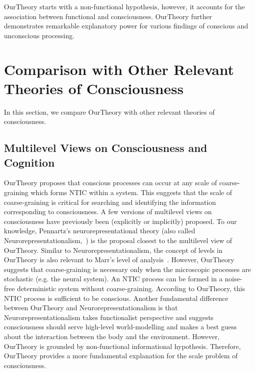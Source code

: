\documentclass[utf8]{article}
\begin{document}
    	    \ac{OurTheory} starts with a non-functional hypothesis, however, it accounts for the association between  functional and consciousness. \ac{OurTheory} further demonstrates remarkable explanatory power for various findings of conscious and unconscious processing. 
	    
    \section{Comparison with Other Relevant Theories of Consciousness}\label{sec:Comparison with other theories}
    In this section, we compare \ac{OurTheory} with other relevant theories of consciousness.
	
	
        \subsection{Multilevel Views on Consciousness and Cognition}\label{sec:MultiLevelView}
    		\ac{OurTheory} proposes that conscious processes can occur at any scale of coarse-graining which forms NTIC within a system. This suggests that the scale of coarse-graining is critical for searching and identifying the information corresponding to consciousness. A few versions of multilevel views on consciousness have previously been (explicitly or implicitly) proposed. To our knowledge, Pennartz's neurorepresentational theory (also called Neurorepresentationalism,~\citep{pennartz2018consciousness,pennartz2015brain}) is the proposal closest to the multilevel view of \ac{OurTheory}. Similar to Neurorepresentationalism, the concept of levels in \ac{OurTheory} is also relevant to Marr's level of analysis~\citep{marr1982vision, pennartz2015brain, pennartz2018consciousness}. 
    		However, \ac{OurTheory} suggests that coarse-graining is necessary only when the microscopic processes are stochastic (e.g. the neural system). An NTIC process can be formed in a noise-free deterministic system without coarse-graining. According to \ac{OurTheory}, this NTIC process is sufficient to be conscious. 
    		Another fundamental difference between \ac{OurTheory} and Neurorepresentationalism is that Neurorepresentationalism takes functionalist perspective and suggests consciousness should serve high-level world-modelling and makes a best guess about the interaction between the body and the environment. 
    		However, \ac{OurTheory} is grounded by non-functional informational hypothesis. Therefore, \ac{OurTheory} provides a more fundamental explanation for the scale problem of consciousness. 
    		
\end{document}
